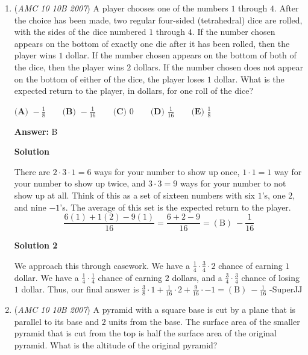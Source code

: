 \begin{enumerate}
 -Michaellin16

 


	\item (\textit{AMC 10 10B 2007}) A player chooses one of the numbers $1$ through $4$. After the choice has been made, two regular four-sided (tetrahedral) dice are rolled, with the sides of the dice numbered $1$ through $4.$ If the number chosen appears on the bottom of exactly one die after it has been rolled, then the player wins $1$ dollar. If the number chosen appears on the bottom of both of the dice, then the player wins $2$ dollars. If the number chosen does not appear on the bottom of either of the dice, the player loses $1$ dollar. What is the expected return to the player, in dollars, for one roll of the dice?


 $\textbf{(A) } -\frac{1}{8} \qquad\textbf{(B) } -\frac{1}{16} \qquad\textbf{(C) } 0 \qquad\textbf{(D) } \frac{1}{16} \qquad\textbf{(E) } \frac{1}{8}$

 \textbf{Answer: }B



\textbf{Solution}

There are $2 \cdot 3 \cdot 1 = 6$ ways for your number to show up once, $1 \cdot 1 = 1$ way for your number to show up twice, and $3 \cdot 3 = 9$ ways for your number to not show up at all. Think of this as a set of sixteen numbers with six $1$'s, one $2$, and nine $-1$'s. The average of this set is the expected return to the player.
 \[\frac{6(1)+1(2)-9(1)}{16} = \frac{6+2-9}{16} = \boxed{\mathrm{(B) \ } -\frac{1}{16}}\]




\textbf{Solution 2}

We approach this through casework. We have a $\frac{1}{4} \cdot \frac{3}{4} \cdot 2$ chance of earning $1$ dollar. We have a $\frac{1}{4} \cdot \frac{1}{4}$ chance of earning $2$ dollars, and a $\frac{3}{4} \cdot \frac{3}{4}$ chance of losing $1$ dollar. Thus, our final answer is $\frac{3}{8} \cdot 1 + \frac{1}{16} \cdot 2 + \frac{9}{16} \cdot -1 = \boxed{\mathrm{(B) \ } -\frac{1}{16}}$  -SuperJJ

 


	\item (\textit{AMC 10 10B 2007}) A pyramid with a square base is cut by a plane that is parallel to its base and $2$ units from the base. The surface area of the smaller pyramid that is cut from the top is half the surface area of the original pyramid. What is the altitude of the original pyramid?



\end{enumerate}
